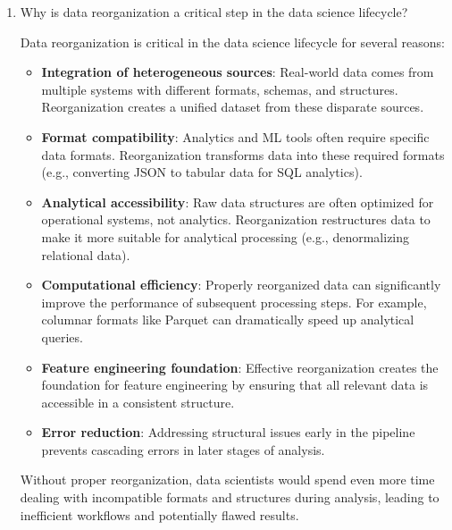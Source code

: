 \documentclass[12pt]{article}
\begin{document}
\begin{enumerate}
    \item Why is data reorganization a critical step in the data science lifecycle?
    
    \begin{tcolorbox}[colback=blue!5!white,colframe=blue!75!black,title={Solution}]
    Data reorganization is critical in the data science lifecycle for several reasons:
    
    \begin{itemize}
        \item \textbf{Integration of heterogeneous sources}: Real-world data comes from multiple systems with different formats, schemas, and structures. Reorganization creates a unified dataset from these disparate sources.
        
        \item \textbf{Format compatibility}: Analytics and ML tools often require specific data formats. Reorganization transforms data into these required formats (e.g., converting JSON to tabular data for SQL analytics).
        
        \item \textbf{Analytical accessibility}: Raw data structures are often optimized for operational systems, not analytics. Reorganization restructures data to make it more suitable for analytical processing (e.g., denormalizing relational data).
        
        \item \textbf{Computational efficiency}: Properly reorganized data can significantly improve the performance of subsequent processing steps. For example, columnar formats like Parquet can dramatically speed up analytical queries.
        
        \item \textbf{Feature engineering foundation}: Effective reorganization creates the foundation for feature engineering by ensuring that all relevant data is accessible in a consistent structure.
        
        \item \textbf{Error reduction}: Addressing structural issues early in the pipeline prevents cascading errors in later stages of analysis.
    \end{itemize}
    
    Without proper reorganization, data scientists would spend even more time dealing with incompatible formats and structures during analysis, leading to inefficient workflows and potentially flawed results.
    \end{tcolorbox}
    

\end{enumerate}
\end{document}
